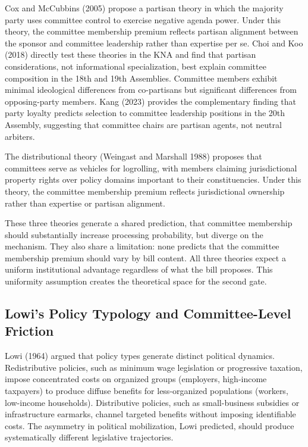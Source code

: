 \documentclass[11pt]{article}
\begin{document}
Cox and McCubbins (2005) propose a partisan theory in which the majority party uses committee control to exercise negative agenda power. Under this theory, the committee membership premium reflects partisan alignment between the sponsor and committee leadership rather than expertise per se. Choi and Koo (2018) directly test these theories in the KNA and find that partisan considerations, not informational specialization, best explain committee composition in the 18th and 19th Assemblies. Committee members exhibit minimal ideological differences from co-partisans but significant differences from opposing-party members. Kang (2023) provides the complementary finding that party loyalty predicts selection to committee leadership positions in the 20th Assembly, suggesting that committee chairs are partisan agents, not neutral arbiters.

The distributional theory (Weingast and Marshall 1988) proposes that committees serve as vehicles for logrolling, with members claiming jurisdictional property rights over policy domains important to their constituencies. Under this theory, the committee membership premium reflects jurisdictional ownership rather than expertise or partisan alignment.

These three theories generate a shared prediction, that committee membership should substantially increase processing probability, but diverge on the mechanism. They also share a limitation: none predicts that the committee membership premium should vary by bill content. All three theories expect a uniform institutional advantage regardless of what the bill proposes. This uniformity assumption creates the theoretical space for the second gate.

\subsection{Lowi's Policy Typology and Committee-Level Friction}\label{sec:lowi}

Lowi (1964) argued that policy types generate distinct political dynamics. Redistributive policies, such as minimum wage legislation or progressive taxation, impose concentrated costs on organized groups (employers, high-income taxpayers) to produce diffuse benefits for less-organized populations (workers, low-income households). Distributive policies, such as small-business subsidies or infrastructure earmarks, channel targeted benefits without imposing identifiable costs. The asymmetry in political mobilization, Lowi predicted, should produce systematically different legislative trajectories.
\end{document}
